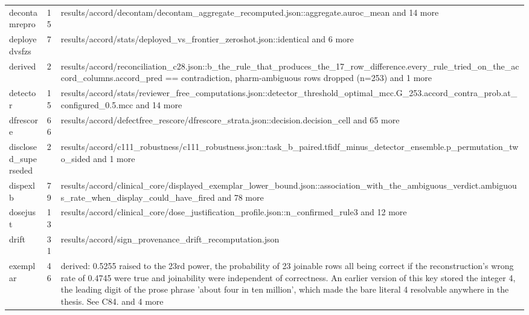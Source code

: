 \begin{longtable}{@{}p{1.6in}p{0.6in}p{3.6in}@{}}
decontamrepro & 15 & results/\allowbreak{}accord/\allowbreak{}decontam/\allowbreak{}decontam\_aggregate\_recomputed.\allowbreak{}json::aggregate.\allowbreak{}auroc\_mean and 14 more\\
deployedvsfzs & 7 & results/\allowbreak{}accord/\allowbreak{}stats/\allowbreak{}deployed\_vs\_frontier\_zeroshot.\allowbreak{}json::identical and 6 more\\
derived & 2 & results/\allowbreak{}accord/\allowbreak{}reconciliation\_c28.\allowbreak{}json::b\_the\_rule\_that\_produces\_the\_17\_row\_difference.\allowbreak{}every\_rule\_tried\_on\_the\_accord\_columns.\allowbreak{}accord\_pred == contradiction, pharm-ambiguous rows dropped (n=253) and 1 more\\
detector & 15 & results/\allowbreak{}accord/\allowbreak{}stats/\allowbreak{}reviewer\_free\_computations.\allowbreak{}json::detector\_threshold\_optimal\_mcc.\allowbreak{}G\_253.\allowbreak{}accord\_contra\_prob.\allowbreak{}at\_configured\_0.\allowbreak{}5.\allowbreak{}mcc and 14 more\\
dfrescore & 66 & results/\allowbreak{}accord/\allowbreak{}defectfree\_rescore/\allowbreak{}dfrescore\_strata.\allowbreak{}json::decision.\allowbreak{}decision\_cell and 65 more\\
disclosed\_superseded & 2 & results/\allowbreak{}accord/\allowbreak{}c111\_robustness/\allowbreak{}c111\_robustness.\allowbreak{}json::task\_b\_paired.\allowbreak{}tfidf\_minus\_detector\_ensemble.\allowbreak{}p\_permutation\_two\_sided and 1 more\\
dispexlb & 79 & results/\allowbreak{}accord/\allowbreak{}clinical\_core/\allowbreak{}displayed\_exemplar\_lower\_bound.\allowbreak{}json::association\_with\_the\_ambiguous\_verdict.\allowbreak{}ambiguous\_rate\_when\_display\_could\_have\_fired and 78 more\\
dosejust & 13 & results/\allowbreak{}accord/\allowbreak{}clinical\_core/\allowbreak{}dose\_justification\_profile.\allowbreak{}json::n\_confirmed\_rule3 and 12 more\\
drift & 31 & results/\allowbreak{}accord/\allowbreak{}sign\_provenance\_drift\_recomputation.\allowbreak{}json\\
exemplar & 46 & derived: 0.\allowbreak{}5255 raised to the 23rd power, the probability of 23 joinable rows all being correct if the reconstruction's wrong rate of 0.\allowbreak{}4745 were true and joinability were independent of correctness.\allowbreak{} An earlier version of this key stored the integer 4, the leading digit of the prose phrase 'about four in ten million', which made the bare literal 4 resolvable anywhere in the thesis.\allowbreak{} See C84.\allowbreak{} and 4 more\\

\end{longtable}
